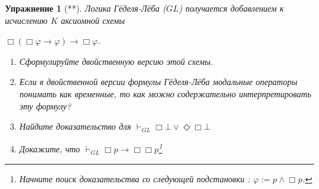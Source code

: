 \documentclass[11pt]{article}
\newtheorem{exercise}[theorem]{Упражнение}
\begin{document}
\begin{exercise}[**] Логика Гёделя-Лёба ($GL$) получается добавлением к исчислению $K$ аксиомной схемы 

\begin{center}
$\Box (\Box \varphi \to \varphi) \to \Box \varphi$.	
\end{center}

\begin{enumerate}
	\item Сформулируйте двойственную версию этой схемы.
    \item Если в двойственной версии формулы Гёделя-Лёба модальные операторы понимать как временные, то как можно содержательно интерпретировать эту формулу?
    \item Найдите доказательство для $\vdash_{GL} \Box \bot \vee \Diamond \Box \bot$
    \item Докажите, что  $\vdash_{GL} \Box p \to \Box \Box p$\footnote{Начните поиск доказательства со следующей подстановки : $\varphi:= p \wedge \Box p$.}
\end{enumerate}
\end{exercise}



\end{document}
